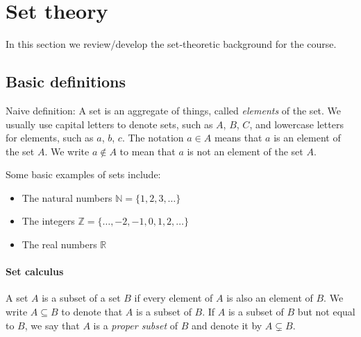 \section{Set theory}

\ifdefined\startaftercountableproduct
  \setcounter{theorem}{67}
  \setcounter{subsection}{5}
\else

\ifdefined\startataxiomofchoice
  \setcounter{theorem}{43}
  \setcounter{subsection}{3}
\else

In this section we review/develop the set‑theoretic background for the course.

\subsection{Basic definitions}
Naive definition: A set is an aggregate of things, called \emph{elements} of the set.  We usually use capital letters to denote sets, such as $A$, $B$, $C$, and lowercase letters for elements, such as $a$, $b$, $c$.  The notation \(a\in A\) means that $a$ is an element of the set $A$. We write $a\notin A$ to mean that $a$ is not an element of the set $A$.

\begin{example}
Some basic examples of sets include:
\begin{itemize}
\item The natural numbers $\mathbb{N} = \{1, 2, 3, \ldots\}$
\item The integers $\mathbb{Z} = \{\ldots, -2, -1, 0, 1, 2, \ldots\}$
\item The real numbers $\mathbb{R}$
\end{itemize}
\end{example}



\paragraph{Set calculus}
A set $A$ is a subset of a set $B$ if every element of $A$ is also an element of $B$.  We write \(A\subseteq B\) to denote that $A$ is a subset of $B$.  If $A$ is a subset of $B$ but not equal to $B$, we say that $A$ is a \emph{proper subset} of $B$ and denote it by \(A\subsetneq B\). 

